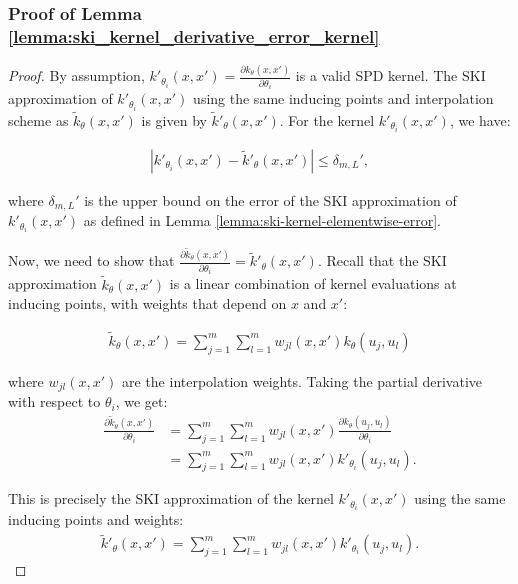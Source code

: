 \subsubsection{Proof of Lemma \ref{lemma:ski_kernel_derivative_error_kernel}}\label{sec:proofski_kernel_derivative_error_kernelz}

\skikernelderivativeerrorkernel*
\begin{proof}
By assumption, $k'_{\theta_i}(x, x') = \frac{\partial k_{\theta}(x, x')}{\partial \theta_i}$ is a valid SPD kernel. The SKI approximation of $k'_{\theta_i}(x, x')$ using the same inducing points and interpolation scheme as $\tilde{k}_{\theta}(x, x')$ is given by $\tilde{k}'_{\theta}(x, x')$. For the kernel $k'_{\theta_i}(x, x')$, we have:

\begin{align*}
\left\vert k'_{\theta_i}(x, x') - \tilde{k}'_{\theta}(x, x') \right\vert \leq \delta_{m,L}',
\end{align*}

where $\delta_{m,L}'$ is the upper bound on the error of the SKI approximation of $k'_{\theta_i}(x, x')$ as defined in Lemma \ref{lemma:ski-kernel-elementwise-error}.

Now, we need to show that $\frac{\partial \tilde{k}_{\theta}(x,x')}{\partial \theta_i} = \tilde{k}'_{\theta}(x, x')$. Recall that the SKI approximation $\tilde{k}_{\theta}(x, x')$ is a linear combination of kernel evaluations at inducing points, with weights that depend on $x$ and $x'$:

\begin{align*}
\tilde{k}_{\theta}(x, x') = \sum_{j=1}^m \sum_{l=1}^m w_{jl}(x, x') k_{\theta}(u_j, u_l)
\end{align*}


where $w_{jl}(x, x')$ are the interpolation weights. Taking the partial derivative with respect to $\theta_i$, we get:
\begin{align*}
\frac{\partial \tilde{k}_{\theta}(x, x')}{\partial \theta_i} &= \sum_{j=1}^m \sum_{l=1}^m w_{jl}(x, x') \frac{\partial k_{\theta}(u_j, u_l)}{\partial \theta_i} \\
&= \sum_{j=1}^m \sum_{l=1}^m w_{jl}(x, x') k'_{\theta_i}(u_j, u_l).
\end{align*}


This is precisely the SKI approximation of the kernel $k'_{\theta_i}(x, x')$ using the same inducing points and weights:
\begin{align*}
\tilde{k}'_{\theta}(x, x') = \sum_{j=1}^m \sum_{l=1}^m w_{jl}(x, x') k'_{\theta_i}(u_j, u_l).
\end{align*}


\end{proof}
